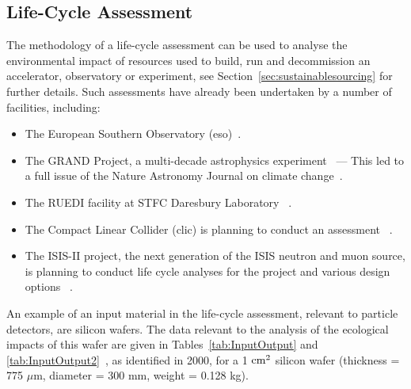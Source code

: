 \documentclass[../SustainableHEP.tex]{subfiles}
\begin{document}

\subsection{Life-Cycle Assessment}

The methodology of a life-cycle assessment can be used to analyse the environmental impact of resources used to build, run and decommission an accelerator, observatory or experiment, see Section~\ref{sec:sustainablesourcing} for further details. Such assessments have already been undertaken by a number of facilities, including:
\begin{itemize}
    \item The European Southern Observatory (\acrshort{eso})~\cite{ESO}.
    \item The GRAND Project, a multi-decade astrophysics experiment~\cite{Aujoux_2021} --- This led to a full issue of the Nature Astronomy Journal on climate change~\cite{NatureClimateIssue}.
    \item The RUEDI facility at STFC Daresbury Laboratory ~\cite{Shepard}.
    \item The Compact Linear Collider (\acrshort{clic}) is planning to conduct an assessment ~\cite{privateBList}.
    \item The ISIS-II project, the next generation of the ISIS neutron and muon source, is planning to conduct life cycle analyses for the project and various design options ~\cite{ISISII}.
\end{itemize}

An example of an input material in the life-cycle assessment, relevant to particle detectors, are silicon wafers. The data relevant to the analysis of the ecological impacts of this wafer are given in Tables~\ref{tab:InputOutput} and \ref{tab:InputOutput2}~\cite{ProBasSi}, as identified in 2000, for a 1 ${\rm cm}^2$ silicon wafer (thickness = 775 $\mu$m, diameter = 300 mm, weight = 0.128 kg).

\end{document}
